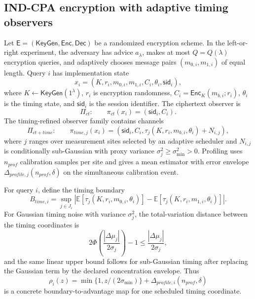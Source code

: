 \documentclass[11pt]{article}
\theoremstyle{definition}
\theoremstyle{plain}
\theoremstyle{remark}
\newcommand{\E}{\mathbb{E}}
\begin{document}
\subsection{IND-CPA encryption with adaptive timing observers}

Let $\mathsf E=(\mathsf{KeyGen},\mathsf{Enc},\mathsf{Dec})$ be a randomized encryption scheme. In the left-or-right experiment, the adversary has advice $a_\lambda$, makes at most $Q=Q(\lambda)$ encryption queries, and adaptively chooses message pairs $(m_{0,i},m_{1,i})$ of equal length. Query $i$ has implementation state
\[
    x_i=(K,r_i,m_{0,i},m_{1,i},C_i,\theta_i,\mathsf{sid}_i),
\]
where $K\leftarrow\mathsf{KeyGen}(1^\lambda)$, $r_i$ is encryption randomness, $C_i=\mathsf{Enc}_K(m_{b,i};r_i)$, $\theta_i$ is the timing state, and $\mathsf{sid}_i$ is the session identifier. The ciphertext observer is
\[
    \Pi_{ct}:\qquad \pi_{ct}(x_i)=(\mathsf{sid}_i,C_i).
\]
The timing-refined observer family contains channels
\[
    \Pi_{ct+time}:\qquad \pi_{time,j}(x_i)=(\mathsf{sid}_i,C_i,\tau_j(K,r_i,m_{b,i},\theta_i)+N_{i,j}),
\]
where $j$ ranges over measurement sites selected by an adaptive scheduler and $N_{i,j}$ is conditionally sub-Gaussian with proxy variance $\sigma_j^2\ge\sigma_{\min}^2>0$. Profiling uses $n_{prof}$ calibration samples per site and gives a mean estimator with error envelope $\Delta_{profile,j}(n_{prof},\delta)$ on the simultaneous calibration event.

For query $i$, define the timing boundary
\[
B_{time,i}=\sup_{j\in J_i}\left|\E[\tau_j(K,r_i,m_{0,i},\theta_i)]-\E[\tau_j(K,r_i,m_{1,i},\theta_i)]\right|.
\]
For Gaussian timing noise with variance $\sigma_j^2$, the total-variation distance between the timing coordinates is
\[
2\Phi\!\left(\frac{|\Delta\mu_j|}{2\sigma_j}\right)-1\le \frac{|\Delta\mu_j|}{2\sigma_j},
\]
and the same linear upper bound follows for sub-Gaussian timing after replacing the Gaussian term by the declared concentration envelope. Thus
\[
    \rho_i(z)=\min\{1,z/(2\sigma_{\min})\}+\Delta_{profile,i}(n_{prof},\delta)
\]
is a concrete boundary-to-advantage map for one scheduled timing coordinate.
\end{document}
